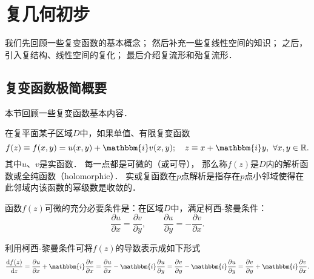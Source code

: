 
\chapter{复几何初步}\label{chcx}

我们先回顾一些复变函数的基本概念；
然后补充一些复线性空间的知识；
之后，引入复结构、线性空间的复化；
最后介绍复流形和殆复流形．


\section{复变函数极简概要}\label{chcx:sec_cxf}
本节回顾一些复变函数基本内容．%

在复平面某子区域$D$中，如果单值、有限复变函数
\begin{equation}\label{chcx:eqn_complex-function}
    f(z)\equiv f(x,y) = u(x,y) + \mathbbm{i} v(x,y); \quad
    z\equiv x+ \mathbbm{i} y, \ \forall x,y\in \mathbb{R}.
\end{equation}
其中$u$、$v$是实函数．
每一点都是可微的（或可导），
那么称$f(z)$是$D$内的{\heiti 解析函数}或{\heiti 全纯函数}（holomorphic）．
实或复函数在$p$点解析是指存在$p$点小邻域使得在此邻域内该函数的幂级数是收敛的．


函数$f(z)$可微的充分必要条件是：在区域$D$中，满足{\heiti 柯西-黎曼条件}：
\begin{equation}\label{chcx:eqn_Cauchy-Riemann}
    \frac{\partial u}{\partial x} = \frac{\partial v}{\partial y},\qquad
    \frac{\partial u}{\partial y} = -\frac{\partial v}{\partial x} .
\end{equation}

利用柯西-黎曼条件可将$f(z)$的导数表示成如下形式
\begin{equation}
    \frac{{\rm d} f(z)}{{\rm d}z}=\frac{\partial u}{\partial x}+\mathbbm{i}\frac{\partial v}{\partial x}
    =\frac{\partial u}{\partial x} - \mathbbm{i}\frac{\partial u}{\partial y}
    =\frac{\partial v}{\partial y} - \mathbbm{i}\frac{\partial u}{\partial y}
    =\frac{\partial v}{\partial y} + \mathbbm{i}\frac{\partial v}{\partial x}.
\end{equation}

